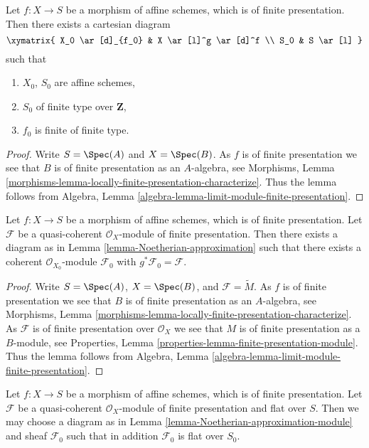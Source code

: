\begin{lemma}
\label{lemma-Noetherian-approximation}
Let $f : X \to S$ be a morphism of affine schemes, which is of finite
presentation. Then there exists a cartesian diagram
$$
\xymatrix{
X_0 \ar[d]_{f_0} & X \ar[l]^g \ar[d]^f \\
S_0 & S \ar[l]
}
$$
such that
\begin{enumerate}
\item $X_0$, $S_0$ are affine schemes,
\item $S_0$ of finite type over $\mathbf{Z}$,
\item $f_0$ is finite of finite type.
\end{enumerate}
\end{lemma}

\begin{proof}
Write $S = \Spec(A)$ and $X = \Spec(B)$.
As $f$ is of finite presentation we see that
$B$ is of finite presentation as an $A$-algebra, see
Morphisms,
Lemma \ref{morphisms-lemma-locally-finite-presentation-characterize}.
Thus the lemma follows from
Algebra, Lemma \ref{algebra-lemma-limit-module-finite-presentation}.
\end{proof}

\begin{lemma}
\label{lemma-Noetherian-approximation-module}
Let $f : X \to S$ be a morphism of affine schemes, which is of finite
presentation. Let $\mathcal{F}$ be a quasi-coherent $\mathcal{O}_X$-module
of finite presentation. Then there exists a diagram as in
Lemma \ref{lemma-Noetherian-approximation}
such that there exists a coherent $\mathcal{O}_{X_0}$-module $\mathcal{F}_0$
with $g^*\mathcal{F}_0 = \mathcal{F}$.
\end{lemma}

\begin{proof}
Write $S = \Spec(A)$, $X = \Spec(B)$, and
$\mathcal{F} = \widetilde{M}$. As $f$ is of finite presentation we see that
$B$ is of finite presentation as an $A$-algebra, see
Morphisms,
Lemma \ref{morphisms-lemma-locally-finite-presentation-characterize}.
As $\mathcal{F}$ is of finite presentation over $\mathcal{O}_X$ we see that
$M$ is of finite presentation as a $B$-module, see
Properties, Lemma \ref{properties-lemma-finite-presentation-module}.
Thus the lemma follows from
Algebra, Lemma \ref{algebra-lemma-limit-module-finite-presentation}.
\end{proof}

\begin{lemma}
\label{lemma-Noetherian-approximation-flat-module}
Let $f : X \to S$ be a morphism of affine schemes, which is of finite
presentation. Let $\mathcal{F}$ be a quasi-coherent $\mathcal{O}_X$-module
of finite presentation and flat over $S$. Then we may choose a diagram as in
Lemma \ref{lemma-Noetherian-approximation-module}
and sheaf $\mathcal{F}_0$ such that in addition $\mathcal{F}_0$
is flat over $S_0$.
\end{lemma}

